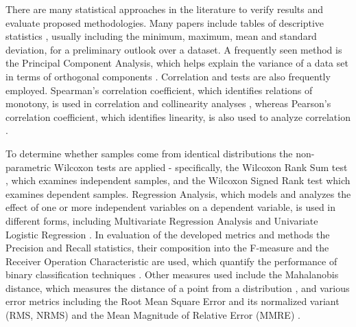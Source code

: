         There are many statistical approaches in the literature to verify results and evaluate proposed methodologies. Many papers include tables of descriptive statistics \cite{s68_understandability, s12_cohesion, s118_cohesion, s88_coupling, s13_maintainability}, usually including the minimum, maximum, mean and standard deviation, for a preliminary outlook over a dataset. 
        A frequently seen method is the Principal Component Analysis, which helps explain the variance of a data set in terms of orthogonal components \cite{s23_coupling, s12_cohesion, s89_coupling}.
        Correlation and tests are also frequently employed. Spearman's correlation coefficient, which identifies relations of monotony, is used in correlation and collinearity analyses \cite{s68_understandability, s12_cohesion}, whereas Pearson's correlation coefficient, which identifies linearity, is also used to analyze correlation \cite{s88_coupling, s13_maintainability}.
        
        To determine whether samples come from identical distributions the non-parametric Wilcoxon tests are applied -  specifically, the Wilcoxon Rank Sum test \cite{s29_cohesion}, which examines independent samples, and the Wilcoxon Signed Rank test \cite{s89_coupling} which examines dependent samples.
        Regression Analysis, which models and analyzes the effect of one or more independent variables on a dependent variable, is used in different forms, including Multivariate Regression Analysis \cite{s68_understandability, s12_cohesion} and Univariate Logistic Regression \cite{s12_cohesion}.
        In evaluation of the developed metrics and methods the Precision and Recall statistics, their composition into the F-measure and the Receiver Operation Characteristic are used, which quantify the performance of binary classification techniques \cite{s116_maintainability, s12_cohesion, s89_coupling}.
        Other measures used include the Mahalanobis distance, which measures the distance of a point from a distribution \cite{s12_cohesion}, and various error metrics including the Root Mean Square Error and its normalized variant (RMS, NRMS) and the Mean Magnitude of Relative Error (MMRE) \cite{s68_understandability, s13_maintainability}.
        

